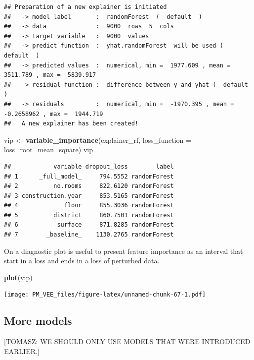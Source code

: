 \documentclass[12pt,]{krantz}
\newenvironment{Shaded}{\begin{snugshade}}{\end{snugshade}}
\newcommand{\DataTypeTok}[1]{\textcolor[rgb]{0.13,0.29,0.53}{#1}}
\newcommand{\KeywordTok}[1]{\textcolor[rgb]{0.13,0.29,0.53}{\textbf{#1}}}
\newcommand{\NormalTok}[1]{#1}
\newcommand{\StringTok}[1]{\textcolor[rgb]{0.31,0.60,0.02}{#1}}
\begin{document}
\begin{verbatim}
## Preparation of a new explainer is initiated
##   -> model label       :  randomForest  (  default  )
##   -> data              :  9000  rows  5  cols 
##   -> target variable   :  9000  values 
##   -> predict function  :  yhat.randomForest  will be used (  default  )
##   -> predicted values  :  numerical, min =  1977.609 , mean =  3511.789 , max =  5839.917  
##   -> residual function :  difference between y and yhat (  default  )
##   -> residuals         :  numerical, min =  -1970.395 , mean =  -0.2658962 , max =  1944.719  
##   A new explainer has been created!
\end{verbatim}

\begin{Shaded}
\begin{Highlighting}[]
\NormalTok{vip <-}\StringTok{ }\KeywordTok{variable_importance}\NormalTok{(explainer_rf, }
            \DataTypeTok{loss_function =}\NormalTok{ loss_root_mean_square)}
\NormalTok{vip}
\end{Highlighting}
\end{Shaded}

\begin{verbatim}
##            variable dropout_loss        label
## 1      _full_model_     794.5552 randomForest
## 2          no.rooms     822.6120 randomForest
## 3 construction.year     853.5165 randomForest
## 4             floor     855.3036 randomForest
## 5          district     860.7501 randomForest
## 6           surface     871.8285 randomForest
## 7        _baseline_    1130.2765 randomForest
\end{verbatim}

On a diagnostic plot is useful to present feature importance as an interval that start in a loss and ends in a loss of perturbed data.

\begin{Shaded}
\begin{Highlighting}[]
\KeywordTok{plot}\NormalTok{(vip)}
\end{Highlighting}
\end{Shaded}

\texttt{[image: PM\_VEE\_files/figure-latex/unnamed-chunk-67-1.pdf]}

\hypertarget{more-models}{%
\subsection{More models}\label{more-models}}

{[}TOMASZ: WE SHOULD ONLY USE MODELS THAT WERE INTRODUCED EARLIER.{]}
\end{document}
